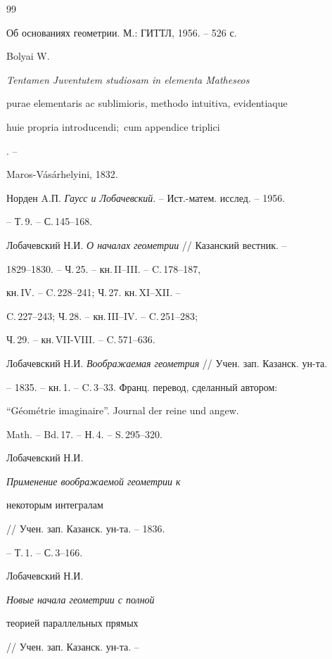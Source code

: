 \begin{thebibliography}{99}







Об основаниях геометрии. М.: ГИТТЛ, 1956. -- 526 с.




Bolyai W. {\em Tentamen Juventutem studiosam in elementa Matheseos


purae elementaris ac sublimioris, methodo intuitiva, evidentiaque


huie propria introducendi$;$ cum appendice triplici}. --


Maros-V\'a{}s\'a{}rhelyini, 1832.




Норден A.П. {\em Гаусс и Лобачевский}. -- Ист.-матем. исслед. -- 1956.


-- Т.\,9. -- С.\,145--168. 




Лобачевский Н.И. {\em О началах геометрии} // Казанский вестник. --


1829--1830. -- Ч.\,25. -- кн.\,II--III. -- C.\,178--187, 


кн.\,IV. -- C.\,228--241; Ч.\,27. кн.\,XI--XII. --


C.\,227--243; Ч.\,28. -- кн.\,III--IV. -- C.\,251--283; 


Ч.\,29. -- кн.\,VII-VIII. -- C.\,571--636. 




Лобачевский Н.И. {\em Воображаемая геометрия} // Учен. зап. Казанск. ун-та.


-- 1835. -- кн.\,1. -- C.\,3--33. Франц. перевод, сделанный автором:


``G\'e{}om\'e{}trie imaginaire''. Journal der reine und angew.


Math. -- Bd.\,17. -- Н.\,4. -- S.\,295--320.




Лобачевский Н.И. {\em Применение воображаемой геометрии к 


некоторым интегралам} // Учен. зап. Казанск. ун-та. -- 1836.


-- Т.\,1. -- С.\,3--166.




Лобачевский Н.И. {\em Новые начала геометрии с полной 


теорией параллельных прямых} // Учен. зап. Казанск. ун-та. --



\end{thebibliography}
